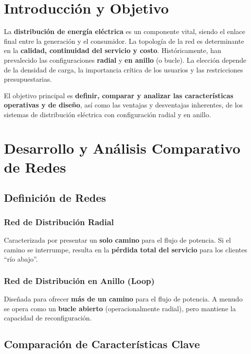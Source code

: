 \section{Introducción y Objetivo}

La \textbf{distribución de energía eléctrica} es un componente vital, siendo el enlace final entre la generación y el consumidor. La topología de la red es determinante en la \textbf{calidad, continuidad del servicio y costo}. Históricamente, han prevalecido las configuraciones \textbf{radial} y \textbf{en anillo} (o bucle). La elección depende de la densidad de carga, la importancia crítica de los usuarios y las restricciones presupuestarias.

El objetivo principal es \textbf{definir, comparar y analizar las características operativas y de diseño}, así como las ventajas y desventajas inherentes, de los sistemas de distribución eléctrica con configuración radial y en anillo.

\section{Desarrollo y Análisis Comparativo de Redes}

\subsection{Definición de Redes}

\subsubsection{Red de Distribución Radial}
Caracterizada por presentar un \textbf{solo camino} para el flujo de potencia. Si el camino se interrumpe, resulta en la \textbf{pérdida total del servicio} para los clientes ``río abajo''.

\subsubsection{Red de Distribución en Anillo (Loop)}
Diseñada para ofrecer \textbf{más de un camino} para el flujo de potencia. A menudo se opera como un \textbf{bucle abierto} (operacionalmente radial), pero mantiene la capacidad de reconfiguración.

\subsection{Comparación de Características Clave}


